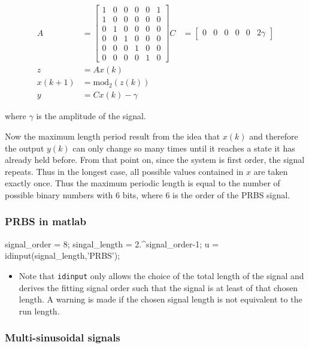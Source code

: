 \documentclass[10pt,a4paper]{scrartcl}
\begin{document}
\begin{multicols*}{2}
\begin{itemize}
\begin{align*}
A &= \begin{bmatrix}
1&0&0&0&0&1\\
1&0&0&0&0&0\\
0&1&0&0&0&0\\
0&0&1&0&0&0\\
0&0&0&1&0&0\\
0&0&0&0&1&0
\end{bmatrix}
C &= \begin{bmatrix}
0&0&0&0&0&2\gamma
\end{bmatrix}\\
z &= Ax(k)\\
x(k+1) &= \text{mod}_2(z(k))\\
y &= Cx(k)-\gamma
\end{align*}

where $\gamma$ is the amplitude of the signal.

Now the maximum length period result from the idea that $x(k)$ and therefore the output $y(k)$ can only change so many times until it reaches a state it has already held before. From that point on, since the system is first order, the signal repeats. Thus in the longest case, all possible values contained in $x$ are taken exactly once. Thus the maximum periodic length is equal to the number of possible binary numbers with 6 bits, where 6 is the order of the PRBS signal.

\end{itemize}

\subsubsection{PRBS in matlab}

\begin{TPMatlab}
signal_order = 8;
singal_length = 2.^signal_order-1;
u = idinput(signal_length,'PRBS');
\end{TPMatlab}

\begin{itemize}
\item Note that \verb+idinput+ only allows the choice of the total length of the signal and derives the fitting signal order such that the signal is at least of that chosen length. A warning is made if the chosen signal length is not equivalent to the run length.
\end{itemize}

\subsubsection{Multi-sinusoidal signals}


\end{multicols*}
\end{document}
